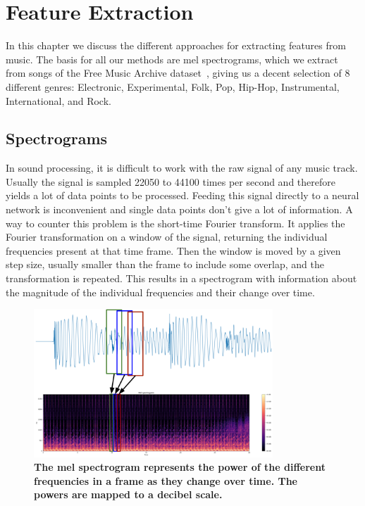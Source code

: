 \chapter{Feature Extraction}\label{ch:extraction}
    In this chapter we discuss the different approaches for extracting features from music. 
    The basis for all our methods are mel spectrograms, which we extract from songs of the Free Music Archive dataset~\cite{FMA}, giving us a decent selection of 8 different genres: Electronic, Experimental, Folk, Pop, Hip-Hop, Instrumental, International, and Rock.

\section{Spectrograms}
    In sound processing, it is difficult to work with the raw signal of any music track.
    Usually the signal is sampled 22050 to 44100 times per second and therefore yields a lot of data points to be processed. 
    Feeding this signal directly to a neural network is inconvenient and single data points don't give a lot of information.
    A way to counter this problem is the short-time Fourier transform. 
    It applies the Fourier transformation on a window of the signal, returning the individual frequencies present at that time frame. 
    Then the window is moved by a given step size, usually smaller than the frame to include some overlap, and the transformation is repeated.
    This results in a spectrogram with information about the magnitude of the individual frequencies and their change over time.\\
    \begin{figure}[!b]
        \centering
        \includegraphics[width=0.8\textwidth]{images/sigToMels.png}
        \caption{\textbf{The mel spectrogram represents the power of the different frequencies in a frame as they change over time. The powers are mapped to a decibel scale.}}
        \label{mel}
    \end{figure}
